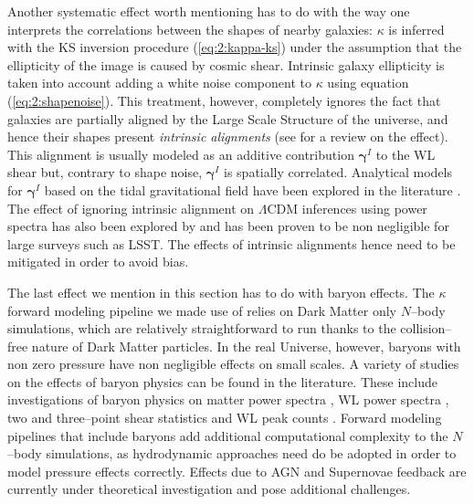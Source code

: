 Another systematic effect worth mentioning has to do with the way one interprets the correlations between the shapes of nearby galaxies: $\kappa$ is inferred with the KS inversion procedure (\ref{eq:2:kappa-ks}) under the assumption that the ellipticity of the image is caused by cosmic shear. Intrinsic galaxy ellipticity is taken into account adding a white noise component to $\kappa$ using equation (\ref{eq:2:shapenoise}). This treatment, however, completely ignores the fact that galaxies are partially aligned by the Large Scale Structure of the universe, and hence their shapes present \textit{intrinsic alignments} (see \citep{IAReview} for a review on the effect). This alignment is usually modeled as an additive contribution $\pmb{\gamma}^I$ to the WL shear but, contrary to shape noise, $\pmb{\gamma}^I$ is spatially correlated. Analytical models for $\pmb{\gamma}^I$ based on the tidal gravitational field have been explored in the literature \citep{IATidal}. The effect of ignoring intrinsic alignment on $\Lambda$CDM inferences using power spectra has also been explored by \citep{IABias} and has been proven to be non negligible for large surveys such as LSST. The effects of intrinsic alignments hence need to be mitigated in order to avoid bias. 

The last effect we mention in this section has to do with baryon effects. The $\kappa$ forward modeling pipeline we made use of relies on Dark Matter only $N$--body simulations, which are relatively straightforward to run thanks to the collision--free nature of Dark Matter particles. In the real Universe, however, baryons with non zero pressure have non negligible effects on small scales. A variety of studies on the effects of baryon physics can be found in the literature. These include investigations of baryon physics on matter power spectra \citep{BaryonsZentner1,BaryonsZentner2}, WL power spectra \citep{BaryonsWhite,BaryonsKnox}, two and three--point shear statistics \citep{BaryonSemboloni} and WL peak counts \citep{BaryonXiuyuan}. Forward modeling pipelines that include baryons add additional computational complexity to the $N$--body simulations, as hydrodynamic approaches need do be adopted in order to model pressure effects correctly. Effects due to AGN and Supernovae feedback are currently under theoretical investigation and pose additional challenges.      

%